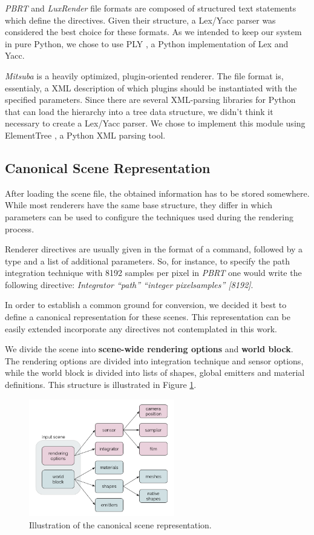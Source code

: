 \textit{PBRT} and \textit{LuxRender} file formats are composed of structured 
text statements which define the directives. Given their structure, a Lex/Yacc 
parser was considered the best choice for these formats. As we intended to keep 
our system in pure Python, we chose to use PLY \cite{ply}, a Python 
implementation of Lex and Yacc.

\textit{Mitsuba} is a heavily optimized, plugin-oriented renderer. The file 
format is, essentialy, a XML description of which plugins should be instantiated 
with the specified parameters. Since there are several 
XML-parsing libraries for Python that can load the hierarchy into a tree data 
structure, we didn't think it necessary to create a Lex/Yacc parser. We chose to 
implement this module using ElementTree \cite{ET}, a Python XML parsing tool.

\subsection{Canonical Scene Representation}
After loading the scene file, the obtained information has to be 
stored somewhere. While most renderers have the same base structure, they differ 
in which parameters can be used to configure the techniques used during the 
rendering process. 

Renderer directives are usually given in the format of a command, followed by a 
type and a list of additional parameters. So, for instance, to specify the path 
integration technique with 8192 samples per pixel in \textit{PBRT} one would 
write the following directive: \textit{Integrator ``path'' ``integer 
pixelsamples'' [8192]}.

In order to establish a common ground for conversion, we decided it best to 
define a canonical representation for these scenes. This representation can be 
easily extended incorporate any directives not contemplated in this work.

We divide the scene into \textbf{scene-wide rendering options} and \textbf{world 
block}. The rendering options are divided into integration technique and sensor 
options, while the world block is divided into lists of shapes, global emitters 
and material definitions. This structure is illustrated in Figure 
\ref{fig:canonicalrep}.

\begin{figure}[h]
\centering
\includegraphics[width=2.5in]{figs/3_system_architecture/canonicalrep.png}
\caption{Illustration of the canonical scene representation.}
\label{fig:canonicalrep}
\end{figure}

